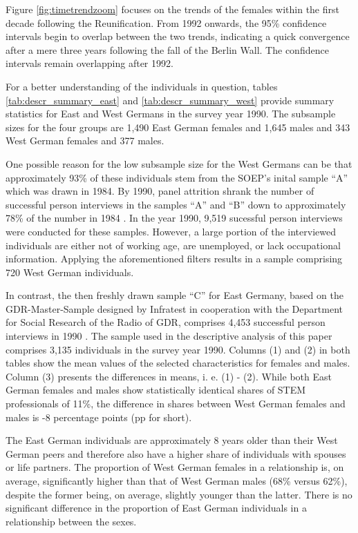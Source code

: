 \documentclass[a4paper, oneside, hyperfootnotes = false]{article}
\begin{document}
{Figure \ref{fig:timetrendzoom} focuses on the trends of the females within the first decade following the Reunification.
From 1992 onwards, the 95\% confidence intervals begin to overlap between the two trends, indicating a quick convergence after a mere three years following the fall of the Berlin Wall.
The confidence intervals remain overlapping after 1992.

For a better understanding of the individuals in question, tables \ref{tab:descr_summary_east} and \ref{tab:descr_summary_west} provide summary statistics for East and West Germans in the survey year 1990.
The subsample sizes for the four groups are 1,490 East German females and 1,645 males and 343 West German females and 377 males.

One possible reason for the low subsample size for the West Germans can be that approximately 93\% of these individuals stem from the SOEP's inital sample ``A'' which was drawn in 1984.
By 1990, panel attrition shrank the number of successful person interviews in the samples ``A'' and ``B'' down to approximately 78\% of the number in 1984 \citep{Siegers2022}.
In the year 1990, 9,519 sucessful person interviews were conducted for these samples.
However, a large portion of the interviewed individuals are either not of working age, are unemployed, or lack occupational information.
Applying the aforementioned filters results in a sample comprising 720 West German individuals.

In contrast, the then freshly drawn sample ``C'' for East Germany, based on the GDR-Master-Sample designed by Infratest in cooperation with the Department for Social Research of the Radio of GDR, comprises 4,453 successful person interviews in 1990 \citep{Infratest2011, Siegers2022}.
The sample used in the descriptive analysis of this paper comprises 3,135 individuals in the survey year 1990.
Columns (1) and (2) in both tables show the mean values of the selected characteristics for females and males.
Column (3) presents the differences in means, i. e. (1) - (2).
While both East German females and males show statistically identical shares of STEM professionals of 11\%, the difference in shares between West German females and males is -8 percentage points (pp for short).

The East German individuals are approximately 8 years older than their West German peers and therefore also have a higher share of individuals with spouses or life partners.
The proportion of West German females in a relationship is, on average, significantly higher than that of West German males (68\% versus 62\%), despite the former being, on average, slightly younger than the latter.
There is no significant difference in the proportion of East German individuals in a relationship between the sexes.

}
\end{document}
